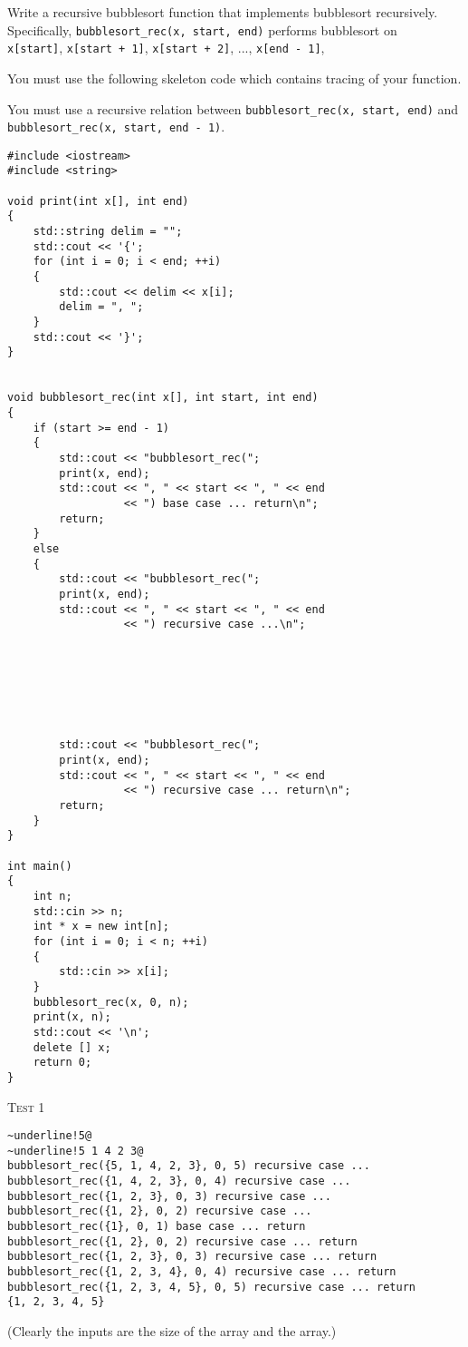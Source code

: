 Write a recursive bubblesort function that implements
bubblesort recursively.
Specifically, \verb!bubblesort_rec(x, start, end)!
performs bubblesort on
\\
\verb!x[start]!,
\verb!x[start + 1]!,
\verb!x[start + 2]!, ...,
\verb!x[end - 1]!,

You must use the following skeleton code which
contains tracing of your function.

You must use a recursive relation between
\verb!bubblesort_rec(x, start, end)!
and
\\
\verb!bubblesort_rec(x, start, end - 1)!.

\begin{Verbatim}[frame=single, fontsize=\small]
#include <iostream>
#include <string>

void print(int x[], int end)
{
    std::string delim = "";
    std::cout << '{';
    for (int i = 0; i < end; ++i)
    {
        std::cout << delim << x[i];
        delim = ", ";
    }
    std::cout << '}';
}


void bubblesort_rec(int x[], int start, int end)
{
    if (start >= end - 1)
    {
        std::cout << "bubblesort_rec(";
        print(x, end);
        std::cout << ", " << start << ", " << end
                  << ") base case ... return\n";
        return;
    }
    else
    {
        std::cout << "bubblesort_rec(";
        print(x, end);
        std::cout << ", " << start << ", " << end
                  << ") recursive case ...\n";




        


        std::cout << "bubblesort_rec(";
        print(x, end);
        std::cout << ", " << start << ", " << end
                  << ") recursive case ... return\n";
        return;
    }
}

int main()
{
    int n;
    std::cin >> n;
    int * x = new int[n];
    for (int i = 0; i < n; ++i)
    {
        std::cin >> x[i];
    }
    bubblesort_rec(x, 0, n);
    print(x, n);
    std::cout << '\n';
    delete [] x;
    return 0;
}
\end{Verbatim}

\textsc{Test 1}
\begin{Verbatim}[commandchars=\~\!\@, fontsize=\small, frame=single]
~underline!5@
~underline!5 1 4 2 3@
bubblesort_rec({5, 1, 4, 2, 3}, 0, 5) recursive case ...
bubblesort_rec({1, 4, 2, 3}, 0, 4) recursive case ...
bubblesort_rec({1, 2, 3}, 0, 3) recursive case ...
bubblesort_rec({1, 2}, 0, 2) recursive case ...
bubblesort_rec({1}, 0, 1) base case ... return
bubblesort_rec({1, 2}, 0, 2) recursive case ... return
bubblesort_rec({1, 2, 3}, 0, 3) recursive case ... return
bubblesort_rec({1, 2, 3, 4}, 0, 4) recursive case ... return
bubblesort_rec({1, 2, 3, 4, 5}, 0, 5) recursive case ... return
{1, 2, 3, 4, 5}
\end{Verbatim}
(Clearly the inputs are the size of the array and the array.)

